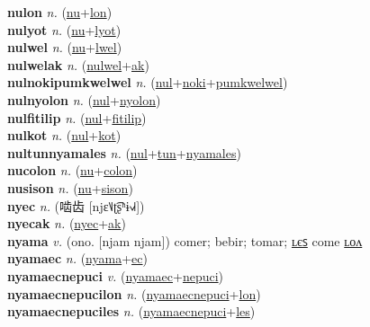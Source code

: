 \textbf{nulon} \textit{n.} (\hyperref[nu]{nu}+\hyperref[lon]{lon})
 \label{nulon} \\
\textbf{nulyot} \textit{n.} (\hyperref[nu]{nu}+\hyperref[lyot]{lyot})
 \label{nulyot} \\
\textbf{nulwel} \textit{n.} (\hyperref[nu]{nu}+\hyperref[lwel]{lwel})
 \label{nulwel} \\
\textbf{nulwelak} \textit{n.} (\hyperref[nulwel]{nulwel}+\hyperref[ak]{ak})
 \label{nulwelak} \\
\textbf{nulnokipumkwelwel} \textit{n.} (\hyperref[nul]{nul}+\hyperref[noki]{noki}+\hyperref[pumkwelwel]{pumkwelwel})
 \label{nulnokipumkwelwel} \\
\textbf{nulnyolon} \textit{n.} (\hyperref[nul]{nul}+\hyperref[nyolon]{nyolon})
 \label{nulnyolon} \\
\textbf{nulfitilip} \textit{n.} (\hyperref[nul]{nul}+\hyperref[fitilip]{fitilip})
 \label{nulfitilip} \\
\textbf{nulkot} \textit{n.} (\hyperref[nul]{nul}+\hyperref[kot]{kot})
 \label{nulkot} \\
\textbf{nultunnyamales} \textit{n.} (\hyperref[nul]{nul}+\hyperref[tun]{tun}+\hyperref[nyamales]{nyamales})
 \label{nultunnyamales} \\
\textbf{nucolon} \textit{n.} (\hyperref[nu]{nu}+\hyperref[colon]{colon})
 \label{nucolon} \\
\textbf{nusison} \textit{n.} (\hyperref[nu]{nu}+\hyperref[sison]{sison})
 \label{nusison} \\
\textbf{nyec} \textit{n.} ({\chinese{}啮齿} [njɛ˥˩ʈ͡ʂʰɨ˧˩˧])
 \label{nyec} \\
\textbf{nyecak} \textit{n.} (\hyperref[nyec]{nyec}+\hyperref[ak]{ak})
 \label{nyecak} \\
\textbf{nyama} \textit{v.} (ono. [njam njam])
comer; bebir; tomar; \hyperref[nyamales]{ʟєꜱ} come \hyperref[nyamalon]{ʟᴏᴧ} \label{nyama} \\
\textbf{nyamaec} \textit{n.} (\hyperref[nyama]{nyama}+\hyperref[ec]{ec})
 \label{nyamaec} \\
\textbf{nyamaecnepuci} \textit{v.} (\hyperref[nyamaec]{nyamaec}+\hyperref[nepuci]{nepuci})
 \label{nyamaecnepuci} \\
\textbf{nyamaecnepucilon} \textit{n.} (\hyperref[nyamaecnepuci]{nyamaecnepuci}+\hyperref[lon]{lon})
 \label{nyamaecnepucilon} \\
\textbf{nyamaecnepuciles} \textit{n.} (\hyperref[nyamaecnepuci]{nyamaecnepuci}+\hyperref[les]{les})
 \label{nyamaecnepuciles} \\
